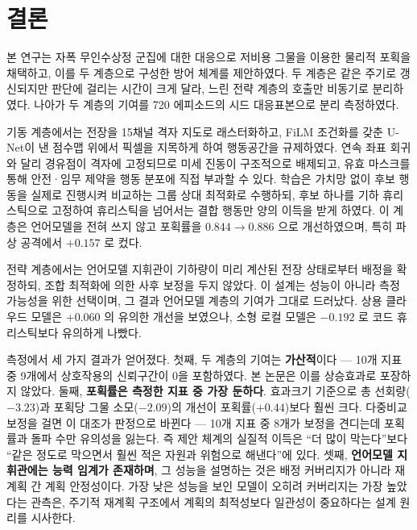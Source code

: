 \section{결론}
\label{sec:conclusion}

본 연구는 자폭 무인수상정 군집에 대한 대응으로 저비용 그물을 이용한 물리적 포획을 채택하고,
이를 두 계층으로 구성한 방어 체계를 제안하였다. 두 계층은 같은 주기로 갱신되지만 판단에
걸리는 시간이 크게 달라, 느린 전략 계층의 호출만 비동기로 분리하였다. 나아가 두 계층의
기여를 720 에피소드의 시드 대응표본으로 분리 측정하였다.

기동 계층에서는 전장을 15채널 격자 지도로 래스터화하고, FiLM 조건화를 갖춘 U-Net이 낸
점수맵 위에서 픽셀을 지목하게 하여 행동공간을 규제하였다. 연속 좌표 회귀와 달리 경유점이
격자에 고정되므로 미세 진동이 구조적으로 배제되고, 유효 마스크를 통해 안전·임무 제약을
행동 분포에 직접 부과할 수 있다. 학습은 가치망 없이 후보 행동을 실제로 진행시켜 비교하는
그룹 상대 최적화로 수행하되, 후보 하나를 기하 휴리스틱으로 고정하여 휴리스틱을 넘어서는
결합 행동만 양의 이득을 받게 하였다. 이 계층은 언어모델을 전혀 쓰지 않고 포획률을 $0.844 \to 0.886$ 으로
개선하였으며, 특히 파상 공격에서 $+0.157$ 로 컸다.

전략 계층에서는 언어모델 지휘관이 기하량이 미리 계산된 전장 상태로부터 배정을 확정하되,
조합 최적화에 의한 사후 보정을 두지 않았다. 이 설계는 성능이 아니라 측정 가능성을 위한
선택이며, 그 결과 언어모델 계층의 기여가 그대로 드러났다. 상용 클라우드 모델은 $+0.060$ 의
유의한 개선을 보였으나, 소형 로컬 모델은 $-0.192$ 로 코드 휴리스틱보다 유의하게 나빴다.

측정에서 세 가지 결과가 얻어졌다. 첫째, 두 계층의 기여는 \textbf{가산적}이다 --- 10개 지표
중 9개에서 상호작용의 신뢰구간이 0을 포함하였다. 본 논문은 이를 상승효과로 포장하지 않았다.
둘째, \textbf{포획률은 측정한 지표 중 가장 둔하다}. 효과크기 기준으로 총 선회량($-3.23$)과
포획당 그물 소모($-2.09$)의 개선이 포획률($+0.44$)보다 훨씬 크다. 다중비교 보정을 걸면 이
대조가 판정으로 바뀐다 --- 10개 지표 중 8개가 보정을 견디는데 포획률과 돌파 수만 유의성을
잃는다. 즉 제안 체계의 실질적 이득은 ``더 많이 막는다''보다 ``같은 정도로 막으면서 훨씬
적은 자원과 위험으로 해낸다''에 있다.
셋째, \textbf{언어모델 지휘관에는 능력 임계가 존재하며}, 그 성능을 설명하는 것은 배정
커버리지가 아니라 재계획 간 계획 안정성이다. 가장 낮은 성능을 보인 모델이 오히려 커버리지는
가장 높았다는 관측은, 주기적 재계획 구조에서 계획의 최적성보다 일관성이 중요하다는 설계
원리를 시사한다.


